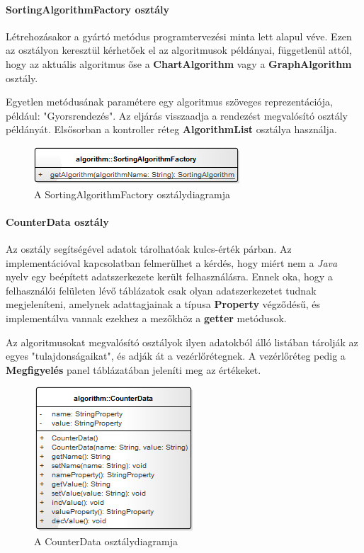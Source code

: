 \documentclass{elteikthesis}
\begin{document}
\paragraph{SortingAlgorithmFactory osztály}
Létrehozásakor a gyártó metódus programtervezési minta lett alapul véve. Ezen az osztályon keresztül kérhetőek el az algoritmusok példányai, függetlenül attól, hogy az aktuális algoritmus őse a \textbf{ChartAlgorithm} vagy a \textbf{GraphAlgorithm} osztály.\par
Egyetlen metódusának paramétere egy algoritmus szöveges reprezentációja, például: "Gyorsrendezés". Az eljárás visszaadja a rendezést megvalósító osztály példányát. Elsősorban a kontroller réteg \textbf{AlgorithmList} osztálya használja.
\begin{figure}[H]
	\centering
	\includegraphics{pics/class/SortingAlgorithmFactory.png}
	\caption{A SortingAlgorithmFactory osztálydiagramja}
\end{figure}
\paragraph{CounterData osztály}
Az osztály segítségével adatok tárolhatóak kulcs-érték párban. Az implementációval kapcsolatban felmerülhet a kérdés, hogy miért nem a \emph{Java} nyelv egy beépített adatszerkezete került felhasználásra. Ennek oka, hogy a felhasználói felületen lévő táblázatok csak olyan adatszerkezetet tudnak megjeleníteni, amelynek adattagjainak a típusa \textbf{Property} végződésű, és implementálva vannak ezekhez a mezőkhöz a \textbf{getter} metódusok.\par
 Az algoritmusokat megvalósító osztályok ilyen adatokból álló listában tárolják az egyes "tulajdonságaikat", és adják át a vezérlőrétegnek. A vezérlőréteg pedig a \textbf{Megfigyelés} panel táblázatában jeleníti meg az értékeket.
\begin{figure}[H]
	\centering
	\includegraphics{pics/class/CounterData.png}
	\caption{A CounterData osztálydiagramja}
\end{figure}
\end{document}
